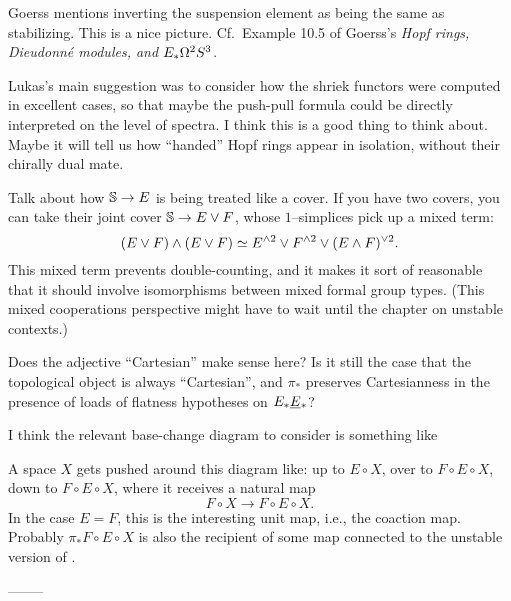 Goerss mentions inverting the suspension element as being the same as stabilizing. This is a nice picture. Cf.\ Example 10.5 of Goerss's \textit{Hopf rings, Dieudonn\'e modules, and $E_* \Loops^2 S^3$}.

Lukas's main suggestion was to consider how the shriek functors were computed in excellent cases, so that maybe the push-pull formula could be directly interpreted on the level of spectra.  I think this is a good thing to think about.  Maybe it will tell us how ``handed'' Hopf rings appear in isolation, without their chirally dual mate.

Talk about how $\S \to E$ is being treated like a cover. If you have two covers, you can take their joint cover $\S \to E \vee F$, whose $1$--simplices pick up a mixed term: \[(E \vee F) \sm (E \vee F) \simeq E^{\sm 2} \vee F^{\sm 2} \vee (E \sm F)^{\vee 2}.\]  This mixed term prevents double-counting, and it makes it sort of reasonable that it should involve isomorphisms between mixed formal group types.  (This mixed cooperations perspective might have to wait until the chapter on unstable contexts.)

Does the adjective ``Cartesian'' make sense here?  Is it still the case that the topological object is always ``Cartesian'', and $\pi_*$ preserves Cartesianness in the presence of loads of flatness hypotheses on $E_* \OS{E}{*}$?


I think the relevant base-change diagram to consider is something like
\begin{center}
\end{center}
A space $X$ gets pushed around this diagram like: up to $E \circ X$, over to $F \circ E \circ X$, down to $F \circ E \circ X$, where it receives a natural map \[F \circ X \to F \circ E \circ X.\]  In the case $E = F$, this is the interesting unit map, i.e., the coaction map.  Probably $\pi_* F \circ E \circ X$ is also the recipient of some map connected to the unstable version of \FH.

--------

